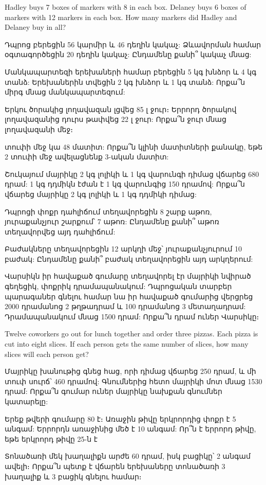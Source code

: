 \problem Hadley buys 7 boxes of markers with 8 in each box.
Delaney buys 6 boxes of markers with 12 markers in each box.
How many markers did Hadley and Delaney buy in all?

\problem 
Դպրոց բերեցին 56 կարմիր և 46 դեղին կակաչ: Ձևավորման 
համար օգտագործեցին 20 դեղին կակաչ: Ընդամենը քանի՞ 
կակաչ մնաց:

\problem
Մանկապարտեզի երեխաների համար բերե\-ցին 5 կգ խնձոր և 4 
կգ տանձ: Երեխաներին տվեցին 2 կգ խնձոր և 1 կգ տանձ: 
Որքա՞ն միրգ մնաց մանկապարտեզում:

\problem 
Երկու ծորակից լողավազան լցվեց 85 լ ջուր։ Երրորդ ծորակով 
լողավազանից դուրս թափ\-վեց 22 լ ջուր: Որքա՞ն ջուր մնաց 
լողավա\-զանի մեջ։

 տուփի մեջ կա 48 մատիտ: Որքա՞ն կլինի մատիտների
քանակը, եթե 2 տուփի մեջ ավելացնենք 3-ական մատիտ:

\problem 
Շուկայում մայրիկը 2 կգ լոլիկի և 1 կգ վարունգի դիմաց վճարեց 
680 դրամ: 1 կգ դդմիկն էժան է 1 կգ վարունգից 150 դրամով: 
Որքա՞ն վճարեց մայրիկը 2 կգ լոլիկի և 1 կգ դդմիկի դիմաց:

\problem
Դպրոցի փոքր դահլիճում տեղավորեցին 8 շարք աթոռ, յուրաքանչյուր 
շարքում՝ 7 աթոռ: Ընդամենը քանի՞ աթոռ տեղավորվեց այդ դահլիճում:

\problem
Բաժակները տեղավորեցին 12 արկղի մեջ՝ յուրաքանչյուրում 10 
բաժակ: Ընդամենը քանի՞ բաժակ տեղավորեցին այդ արկղերում:

\problem
Վարսիկն իր հավաքած գումարը տեղա\-վորել էր մայրիկի նվիրած 
գեղեցիկ, փոքրիկ դրամա\-պանակում: Դպրոցական տարբեր պա\-րագաներ 
գնելու համար նա իր հավաքած գումարից վերցրեց 2000 դրամանոց 
2 թղթա\-դրամ և 100 դրամանոց 3 մետաղադրամ: Դրամապանակում 
մնաց 1500 դրամ: Որքա՞ն դրամ ուներ Վարսիկը։

\problem
Twelve coworkers go out for lunch together and order three 
pizzas. Each pizza is cut into eight slices. If each person 
gets the same number of slices, how many slices will each 
person get?

\problem
Մայրիկը խանութից գնեց հաց, որի դիմաց վճարեց 250 դրամ, 
և մի տուփ սուրճ՝ 460 դրամով: Գնումներից հետո մայրիկի 
մոտ մնաց 1530 դրամ: Որքա՞ն գումար ուներ մայրիկը նախքան 
գնումներ կատարելը:

\problem
Երեք թվերի գումարը 80 է։ Առաջին թիվը երկրորդից փոքր 
է 5 անգամ: Երրորդն առա\-ջինից մեծ է 10 անգամ: Որ՞ն է 
երրորդ թիվը, եթե երկրորդ թիվը 25-ն է



\problem
Տոնածառի մեկ խաղալիքն արժե 60 դրամ, իսկ բացիկը՝ 2 
անգամ ավելի։ Որքա՞ն պետք է վճարեն երեխաները տոնածառի 
3 խաղալիք և 3 բացիկ գնելու համար։


